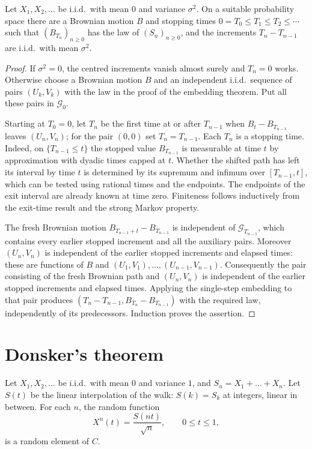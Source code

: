 \begin{corollary}\label{cor:embedwalk}
Let $X_1,X_2,\dots$ be i.i.d.\ with mean $0$ and variance $\sigma^2$. On a suitable probability space there are a Brownian motion $B$ and stopping times
$0=T_0\le T_1\le T_2\le\cdots$ such that $(B_{T_n})_{n\ge0}$ has the law of $(S_n)_{n\ge0}$, and the increments $T_n-T_{n-1}$ are i.i.d.\ with mean $\sigma^2$.
\end{corollary}
\begin{proof}
If $\sigma^2=0$, the centred increments vanish almost surely and $T_n=0$ works. Otherwise choose a Brownian motion $B$ and an independent i.i.d.\ sequence of pairs $(U_k,V_k)$ with the law in the proof of the embedding theorem. Put all these pairs in $\mathcal G_0$.

Starting at $T_0=0$, let $T_n$ be the first time at or after $T_{n-1}$ when $B_t-B_{T_{n-1}}$ leaves $(U_n,V_n)$; for the pair $(0,0)$ set $T_n=T_{n-1}$. Each $T_n$ is a stopping time. Indeed, on $\{T_{n-1}\le t\}$ the stopped value $B_{T_{n-1}}$ is measurable at time $t$ by approximation with dyadic times capped at $t$. Whether the shifted path has left its interval by time $t$ is determined by its supremum and infimum over $[T_{n-1},t]$, which can be tested using rational times and the endpoints. The endpoints of the exit interval are already known at time zero. Finiteness follows inductively from the exit-time result and the strong Markov property.

The fresh Brownian motion $B_{T_{n-1}+t}-B_{T_{n-1}}$ is independent of $\mathcal G_{T_{n-1}}$, which contains every earlier stopped increment and all the auxiliary pairs. Moreover $(U_n,V_n)$ is independent of the earlier stopped increments and elapsed times: these are functions of $B$ and $(U_1,V_1),\dots,(U_{n-1},V_{n-1})$. Consequently the pair consisting of the fresh Brownian path and $(U_n,V_n)$ is independent of the earlier stopped increments and elapsed times. Applying the single-step embedding to that pair produces $(T_n-T_{n-1},B_{T_n}-B_{T_{n-1}})$ with the required law, independently of its predecessors. Induction proves the assertion.
\end{proof}

\section{Donsker's theorem}\label{sec:donsker}

Let $X_1,X_2,\dots$ be i.i.d.\ with mean $0$ and variance $1$, and $S_n=X_1+\dots+X_n$. Let $S(t)$ be the linear interpolation of the walk: $S(k)=S_k$ at integers, linear
in between. For each $n$, the random function
\[
X^n(t)=\frac{S(nt)}{\sqrt n},\qquad0\le t\le1,
\]
is a random element of $C$.

